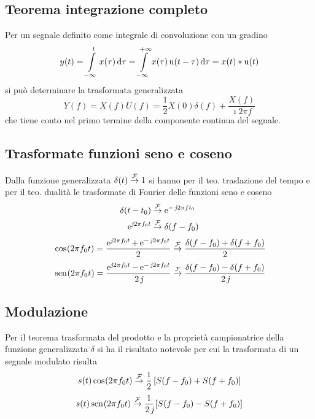\subsection{Teorema integrazione completo}
Per un segnale definito come integrale di convoluzione con un gradino
\[y(t)=\int\limits_{-\infty}^{t}{x(\tau)}{\,\mathop{}\!\mathrm{d}{\tau}}=\int\limits_{-\infty}^{+\infty}{x(\tau)\operatorname{u}(t-\tau)}{\,\mathop{}\!\mathrm{d}{\tau}}=x(t)\ast\operatorname{u}(t)\]
si può determinare la trasformata generalizzata
\begin{equation}
Y(f)=X(f) U(f)=\frac{1}{2} X(0) \delta(f) + \frac{X(f)}{\imath 2\pi f}
\end{equation}
che tiene conto nel primo termine della componente continua del segnale.

\subsection{Trasformate funzioni seno e coseno}
Dalla funzione generalizzata $\delta(t)\overset{\operatorname{\mathcal{F}}}{\rightarrow}1$ si hanno per il teo. traslazione del tempo e per il teo. dualità le trasformate di Fourier delle funzioni seno e coseno
\begin{align*}
\delta(t-t_0)&\overset{\operatorname{\mathcal{F}}}{\to}\operatorname{e}^{-\operatorname{\mathit{j}\!} 2\pi f t_0}\\
\operatorname{e}^{\operatorname{\mathit{j}\!} 2\pi f_0 t}&\overset{\operatorname{\mathcal{F}}}{\to}\delta(f-f_0)
\end{align*}
\begin{equation}
\,{\operatorname{cos}}^{}\!\left({2\pi f_0 t}\right)=\frac{\operatorname{e}^{\operatorname{\mathit{j}\!} 2\pi f_0 t}+\operatorname{e}^{-\operatorname{\mathit{j}\!} 2\pi f_0 t}}{2}\overset{\operatorname{\mathcal{F}}}{\to}\frac{\delta(f-f_0)+\delta(f+f_0)}{2}\end{equation}
\begin{equation}\,{\operatorname{sen}}^{}\!\left({2\pi f_0 t}\right)=\frac{\operatorname{e}^{\operatorname{\mathit{j}\!} 2\pi f_0 t}-\operatorname{e}^{-\operatorname{\mathit{j}\!} 2\pi f_0 t}}{2\operatorname{\mathit{j}\!}}\overset{\operatorname{\mathcal{F}}}{\to}\frac{\delta(f-f_0)-\delta(f+f_0)}{2\operatorname{\mathit{j}\!}}\end{equation}

\subsection{Modulazione}
Per il teorema trasformata del prodotto e la proprietà campionatrice della funzione generalizzata $\delta$ si ha il risultato notevole per cui la trasformata di un segnale modulato risulta
\begin{equation}\label{eq:fourier_modulazione_coseno}
s(t) \,{\operatorname{cos}}^{}\!\left({2\pi f_0 t}\right)\overset{\operatorname{\mathcal{F}}}{\to}\frac{1}{2}\left[S(f-f_0)+S(f+f_0)\right]
\end{equation}
\begin{equation}
s(t) \,{\operatorname{sen}}^{}\!\left({2\pi f_0 t}\right)\overset{\operatorname{\mathcal{F}}}{\to}\frac{1}{2\operatorname{\mathit{j}\!}}\left[S(f-f_0)-S(f+f_0)\right]
\end{equation}

